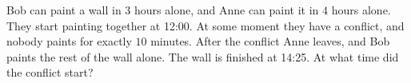 Bob can paint a wall in $3$ hours alone, and Anne can paint it in $4$ hours alone. They start painting together at 12:00. At some moment they have a conflict, and nobody paints for exactly $10$ minutes. After the conflict Anne leaves, and Bob paints the rest of the wall alone. The wall is finished at 14:25. At what time did the conflict start?
